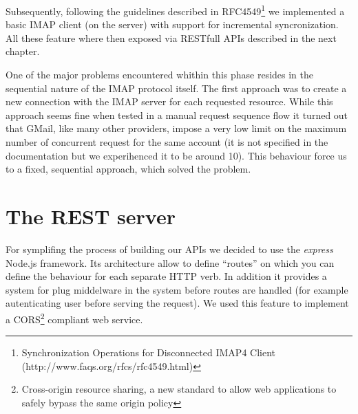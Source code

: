 \documentclass[a4paper,12pt]{report}
\begin{document}
Subsequently, following the guidelines described in RFC4549\footnote{Synchronization Operations for Disconnected IMAP4 Client (http://www.faqs.org/rfcs/rfc4549.html)} we implemented a basic IMAP client (on the server) with support for incremental syncronization. 
All these feature where then exposed via RESTfull APIs described in the next chapter.

One of the major problems encountered whithin this phase resides in the sequential nature of the IMAP protocol itself. The first approach was to create a new connection with the IMAP server for each requested resource. While this approach seems fine when tested in a manual request sequence flow it turned out that GMail, like many other providers, impose a very low limit on the maximum number of concurrent request for the same account (it is not specified in the documentation but we experihenced it to be around 10). This behaviour force us to a fixed, sequential approach, which solved the problem.

\section{The REST server}
For symplifing the process of building our APIs we decided to use the \emph{express} Node.js framework.
Its architecture allow to define ``routes'' on which you can define the behaviour for each separate HTTP verb. In addition it provides a system for plug middelware in the system before routes are handled (for example autenticating user before serving the request). We used this feature to implement a CORS\footnote{Cross-origin resource sharing, a new standard to allow web applications to safely bypass the same origin policy} compliant web service.
\end{document}
